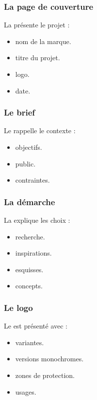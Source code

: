 \subsubsection{La page de couverture}

La  présente le projet :

\begin{itemize}
    \item {} nom de la marque.
    \item {} titre du projet.
    \item {} logo.
    \item {} date.
\end{itemize}

\subsubsection{Le brief}

Le  rappelle le contexte :

\begin{itemize}
    \item {} objectifs.
    \item {} public.
    \item {} contraintes.
\end{itemize}

\subsubsection{La démarche}

La  explique les choix :

\begin{itemize}
    \item {} recherche.
    \item {} inspirations.
    \item {} esquisses.
    \item {} concepts.
\end{itemize}

\subsubsection{Le logo}

Le  est présenté avec :

\begin{itemize}
    \item {} variantes.
    \item {} versions monochromes.
    \item {} zones de protection.
    \item {} usages.
\end{itemize}

